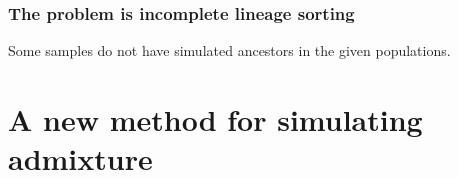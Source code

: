 \documentclass[11pt, mathserif, aspectratio=169]{beamer}
\begin{document}
\begin{frame}
\frametitle{The problem is incomplete lineage sorting}
\begin{center}

\end{center}
Some samples do not have simulated ancestors in the given populations.
\end{frame}

\section{A new method for simulating admixture}

\begin{frame}
\begin{center}
\centering

\end{center}
\end{frame}

\begin{frame}
\begin{center}
\centering

\end{center}
\end{frame}

\begin{frame}
\begin{center}
\centering

\end{center}
\end{frame}

\begin{frame}
\begin{center}
\centering

\end{center}
\end{frame}

\begin{frame}
\begin{center}
\centering

\end{center}
\end{frame}

\begin{frame}
\begin{center}
\centering

\end{center}
\end{frame}

\begin{frame}
\begin{center}
\centering

\end{center}
\end{frame}
\end{document}
